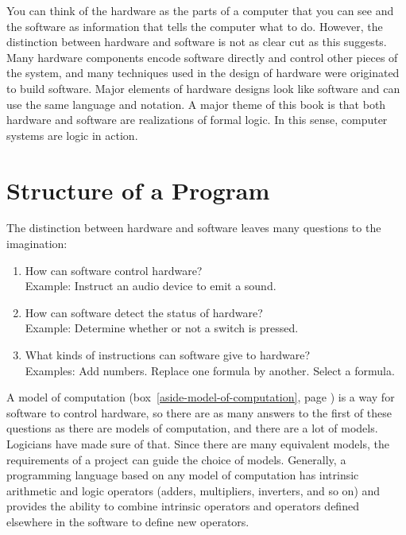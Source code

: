 You can think of the hardware as
the parts of a computer that you can see
and the software as information that tells the computer what to do.
However, the distinction between hardware and software is not as
clear cut as this suggests. Many hardware components
encode software directly and control other pieces of the system,
and many techniques used in the design of
hardware were originated to build software.
Major elements of hardware designs look like software
and can use the same language and notation.
A major theme of this book
is that both hardware and software are realizations of formal logic.
In this sense, computer systems are
logic in action.

\section{Structure of a Program}

The distinction between hardware and software
leaves many questions to the imagination:
\begin{enumerate}
\item How can software control hardware?\\
      Example: Instruct an audio device to emit a sound.
\item How can software detect the status of hardware?\\
      Example: Determine whether or not a switch is pressed.
\item What kinds of instructions can software give to hardware?\\
      Examples: Add numbers. Replace one formula by another. Select a formula.
\end{enumerate}

A model of computation
(box~\ref{aside-model-of-computation}, page \pageref{aside-model-of-computation})
is a way for software to control hardware,
so there are as many answers to the first of these questions
as there are models of computation, and
there are a lot of models.
Logicians have made sure of that.
Since there are many equivalent models,
the requirements of a project can guide the choice of models.
Generally, a programming language based on any model of computation
has intrinsic arithmetic and logic operators
(adders, multipliers, inverters, and so on)
and provides the ability to combine
intrinsic operators and operators
defined elsewhere in the software to
define new operators.

